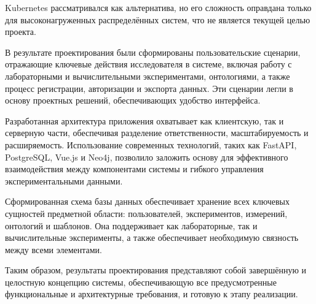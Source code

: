 Kubernetes рассматривался как альтернатива, но его сложность оправдана только для высоконагруженных распределённых систем, что не является текущей целью проекта.


В результате проектирования были сформированы пользовательские сценарии, отражающие ключевые действия исследователя в системе, включая работу с лабораторными и вычислительными экспериментами, онтологиями, а также процесс регистрации, авторизации и экспорта данных.
Эти сценарии легли в основу проектных решений, обеспечивающих удобство интерфейса.

Разработанная архитектура приложения охватывает как клиентскую, так и серверную части, обеспечивая разделение ответственности, масштабируемость и расширяемость.
Использование современных технологий, таких как FastAPI, PostgreSQL, Vue.js и Neo4j, позволило заложить основу для эффективного взаимодействия между компонентами системы и гибкого управления экспериментальными данными.

Сформированная схема базы данных обеспечивает хранение всех ключевых сущностей предметной области: пользователей, экспериментов, измерений, онтологий и шаблонов.
Она поддерживает как лабораторные, так и вычислительные эксперименты, а также обеспечивает необходимую связность между всеми элементами.

Таким образом, результаты проектирования представляют собой завершённую и целостную концепцию системы, обеспечивающую все предусмотренные функциональные и архитектурные требования, и готовую к этапу реализации.